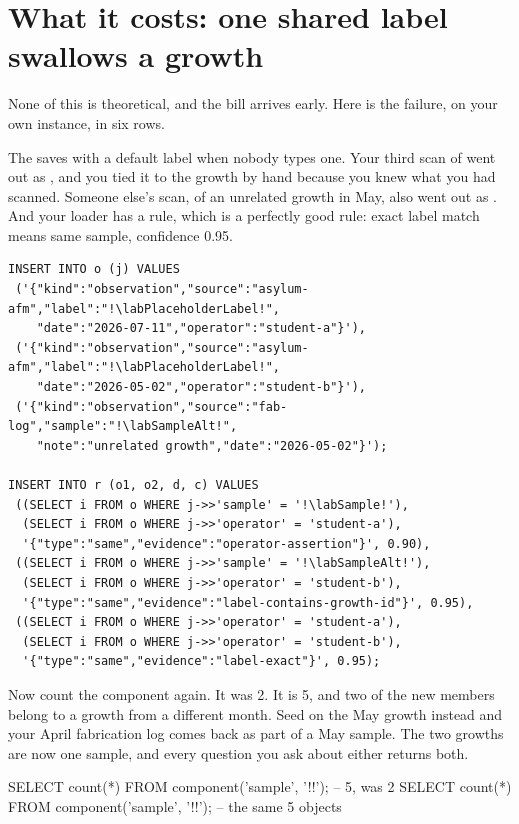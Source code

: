 \section{What it costs: one shared label swallows a growth}

None of this is theoretical, and the bill arrives early. Here is the failure, on your own instance, in six rows.

The \labInstrumentShort{} saves with a default label when nobody types one. Your third scan of \labSampleShort{} went out as \texttt{\labPlaceholderLabel}, and you tied it to the growth by hand because you knew what you had scanned. Someone else's scan, of an unrelated growth in May, also went out as \texttt{\labPlaceholderLabel}. And your loader has a rule, which is a perfectly good rule: exact label match means same sample, confidence 0.95.

\begin{lstlisting}
INSERT INTO o (j) VALUES
 ('{"kind":"observation","source":"asylum-afm","label":"!\labPlaceholderLabel!",
    "date":"2026-07-11","operator":"student-a"}'),
 ('{"kind":"observation","source":"asylum-afm","label":"!\labPlaceholderLabel!",
    "date":"2026-05-02","operator":"student-b"}'),
 ('{"kind":"observation","source":"fab-log","sample":"!\labSampleAlt!",
    "note":"unrelated growth","date":"2026-05-02"}');

INSERT INTO r (o1, o2, d, c) VALUES
 ((SELECT i FROM o WHERE j->>'sample' = '!\labSample!'),
  (SELECT i FROM o WHERE j->>'operator' = 'student-a'),
  '{"type":"same","evidence":"operator-assertion"}', 0.90),
 ((SELECT i FROM o WHERE j->>'sample' = '!\labSampleAlt!'),
  (SELECT i FROM o WHERE j->>'operator' = 'student-b'),
  '{"type":"same","evidence":"label-contains-growth-id"}', 0.95),
 ((SELECT i FROM o WHERE j->>'operator' = 'student-a'),
  (SELECT i FROM o WHERE j->>'operator' = 'student-b'),
  '{"type":"same","evidence":"label-exact"}', 0.95);
\end{lstlisting}

Now count the component again. It was 2. It is 5, and two of the new members belong to a growth from a different month. Seed on the May growth instead and your April fabrication log comes back as part of a May sample. The two growths are now one sample, and every question you ask about either returns both.

\begin{Check}
SELECT count(*) FROM component('sample', '!\labSample!');   -- 5, was 2
SELECT count(*) FROM component('sample', '!\labSampleAlt!');   -- the same 5 objects
\end{Check}


